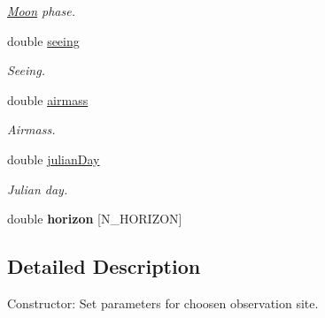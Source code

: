 \begin{DoxyCompactItemize}
\begin{DoxyCompactList}\small\item\em \hyperlink{class_moon}{Moon} phase. \end{DoxyCompactList}\item 
\hypertarget{class_observatory_adb733981a5dd23328297215e929395fc}{double \hyperlink{class_observatory_adb733981a5dd23328297215e929395fc}{seeing}}\label{class_observatory_adb733981a5dd23328297215e929395fc}

\begin{DoxyCompactList}\small\item\em Seeing. \end{DoxyCompactList}\item 
\hypertarget{class_observatory_a51fa982e2c863356e0fdbb198609dabe}{double \hyperlink{class_observatory_a51fa982e2c863356e0fdbb198609dabe}{airmass}}\label{class_observatory_a51fa982e2c863356e0fdbb198609dabe}

\begin{DoxyCompactList}\small\item\em Airmass. \end{DoxyCompactList}\item 
\hypertarget{class_observatory_a7f40eaf1225029ec02125ad067b381d0}{double \hyperlink{class_observatory_a7f40eaf1225029ec02125ad067b381d0}{julian\-Day}}\label{class_observatory_a7f40eaf1225029ec02125ad067b381d0}

\begin{DoxyCompactList}\small\item\em Julian day. \end{DoxyCompactList}\item 
\hypertarget{class_observatory_a8a86db9fc5ce3dfc5d63641d38a52a45}{double {\bfseries horizon} \mbox{[}N\-\_\-\-H\-O\-R\-I\-Z\-O\-N\mbox{]}}\label{class_observatory_a8a86db9fc5ce3dfc5d63641d38a52a45}

\end{DoxyCompactItemize}


\subsection{Detailed Description}
Constructor\-: Set parameters for choosen observation site. 

